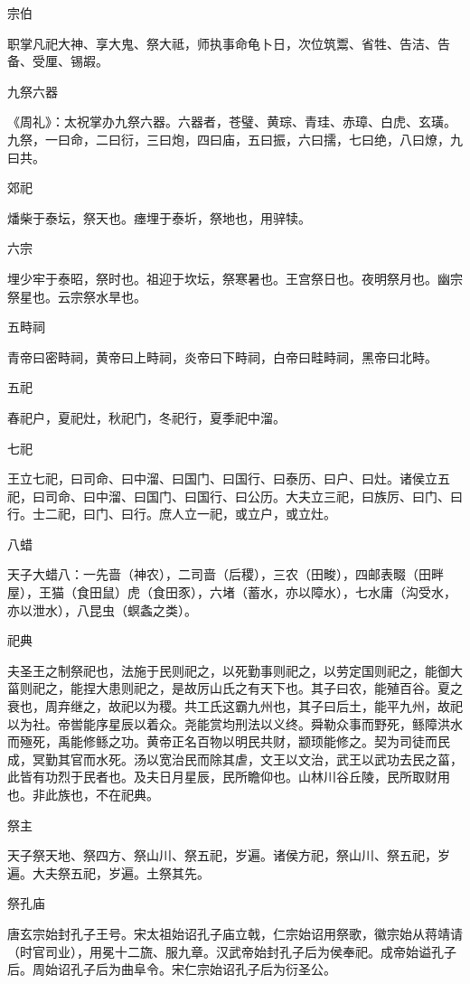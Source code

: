 \documentclass[a4paper,12pt,UTF8,twoside]{ctexbook}
\begin{document}
    宗伯
    
    职掌凡祀大神、享大鬼、祭大祗，师执事命龟卜日，次位筑鬻、省牲、告洁、告备、受厘、锡嘏。
    
    九祭六器
    
    《周礼》：太祝掌办九祭六器。六器者，苍璧、黄琮、青珪、赤璋、白虎、玄璜。九祭，一曰命，二曰衍，三曰炮，四曰庙，五曰振，六曰擩，七曰绝，八曰燎，九曰共。
    
    郊祀
    
    燔柴于泰坛，祭天也。瘗埋于泰圻，祭地也，用骍犊。
    
    六宗
    
    埋少牢于泰昭，祭时也。祖迎于坎坛，祭寒暑也。王宫祭日也。夜明祭月也。幽宗祭星也。云宗祭水旱也。
    
    五畤祠
    
    青帝曰密畤祠，黄帝曰上畤祠，炎帝曰下畤祠，白帝曰畦畤祠，黑帝曰北畤。
    
    五祀
    
    春祀户，夏祀灶，秋祀门，冬祀行，夏季祀中溜。
    
    七祀
    
    王立七祀，曰司命、曰中溜、曰国门、曰国行、曰泰历、曰户、曰灶。诸侯立五祀，曰司命、曰中溜、曰国门、曰国行、曰公历。大夫立三祀，曰族厉、曰门、曰行。士二祀，曰门、曰行。庶人立一祀，或立户，或立灶。
    
    八蜡
    
    天子大蜡八：一先啬（神农），二司啬（后稷），三农（田畯），四邮表畷（田畔屋），王猫（食田鼠）虎（食田豕），六堵（蓄水，亦以障水），七水庸（沟受水，亦以泄水），八昆虫（螟螽之类）。
    
    祀典
    
    夫圣王之制祭祀也，法施于民则祀之，以死勤事则祀之，以劳定国则祀之，能御大菑则祀之，能捏大患则祀之，是故厉山氏之有天下也。其子曰农，能殖百谷。夏之衰也，周弃继之，故祀以为稷。共工氏这霸九州也，其子曰后土，能平九州，故祀以为社。帝喾能序星辰以着众。尧能赏均刑法以义终。舜勒众事而野死，鲧障洪水而殛死，禹能修鲧之功。黄帝正名百物以明民共财，颛顼能修之。契为司徒而民成，冥勤其官而水死。汤以宽治民而除其虐，文王以文治，武王以武功去民之菑，此皆有功烈于民者也。及夫日月星辰，民所瞻仰也。山林川谷丘陵，民所取财用也。非此族也，不在祀典。
    
    祭主
    
    天子祭天地、祭四方、祭山川、祭五祀，岁遍。诸侯方祀，祭山川、祭五祀，岁遍。大夫祭五祀，岁遍。土祭其先。
    
    祭孔庙
    
    唐玄宗始封孔子王号。宋太祖始诏孔子庙立戟，仁宗始诏用祭歌，徽宗始从蒋靖请（时官司业），用冕十二旒、服九章。汉武帝始封孔子后为侯奉祀。成帝始谥孔子后。周始诏孔子后为曲阜令。宋仁宗始诏孔子后为衍圣公。
    
\end{document}
